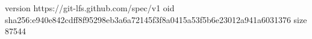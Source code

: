version https://git-lfs.github.com/spec/v1
oid sha256:e940e842cdff8f95298eb3a6a72145f3f8a0415a53f5b6e23012a941a6031376
size 87544
